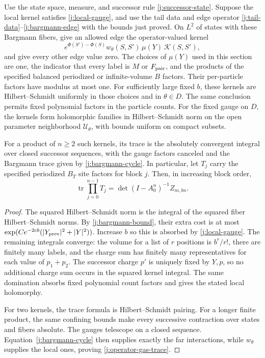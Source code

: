\begin{proposition}\label{j:block-kernel}
Use the state space, measure, and successor rule
\eqref{j:successor-state}. Suppose the local kernel satisfies
\eqref{j:local-gauge}, and use the tail data and edge operator
\eqref{j:tail-data}--\eqref{j:bargmann-edge} with the bounds just proved.
On $L^2$ of states with these Bargmann fibers, give an allowed edge the
operator-valued kernel
\begin{equation}\label{j:gauged-kernel}
 e^{\Phi(S')-\Phi(S)}w_\theta(S,S')\,\mu(Y)\,\mathcal K(S,S'),
\end{equation}
and give every other edge value zero. The choices of $\mu(Y)$ used in this
section are one, the indicator that every label is $M$ or $F_{\rm pair}$,
and the products of the specified balanced periodized or infinite-volume
$B$ factors. Their per-particle factors have modulus at most one. For
sufficiently large fixed $b$, these kernels are Hilbert--Schmidt uniformly
in those choices and in $\theta\in D$.
The same conclusion permits fixed polynomial factors in the particle
counts. For the fixed gauge on $D$, the kernels form holomorphic families
in Hilbert--Schmidt norm on the open parameter neighborhood $\mathcal U_\theta$, with
bounds uniform on compact subsets.

For a product of $n\ge2$ such kernels, its trace is the absolutely
convergent integral over closed successor sequences, with the gauge
factors canceled and the Bargmann trace given by
\eqref{j:bargmann-cycle}. In particular, let $T_j$ carry the specified
periodized $B_T$ site factors for block $j$. Then, in increasing block order,
\begin{equation}\label{j:operator-gas-trace}
 \operatorname{tr}\prod_{j=0}^{n-1}T_j
 =\det(I-A_0^n)^{-1}Z_{m,bn}.
\end{equation}
\end{proposition}
\begin{proof}
The squared Hilbert--Schmidt norm is the integral of the squared fiber
Hilbert--Schmidt norms. By \eqref{j:bargmann-bound}, their extra cost is
at most $\exp(Ce^{-2cb}(|Y_{\rm prev}|^2+|Y|^2))$. Increase $b$ so this
is absorbed by \eqref{j:local-gauge}. The remaining integrals converge:
the volume for a list of $r$ positions is $b^r/r!$, there are finitely
many labels, and the charge sum has finitely many representatives for
each value of $p_1+p_2$. The successor charge $p'$ is uniquely fixed by
$Y,p$, so no additional charge sum occurs in the squared kernel integral.
The same domination absorbs fixed polynomial count factors and gives the
stated local holomorphy.

For two kernels, the trace formula is Hilbert--Schmidt pairing. For a
longer finite product, the same confining bounds make every successive
contraction over states and fibers absolute. The gauges telescope on a
closed sequence. Equation~\eqref{j:bargmann-cycle} then supplies exactly
the far interactions, while $w_\theta$ supplies the local ones, proving
\eqref{j:operator-gas-trace}.
\end{proof}

